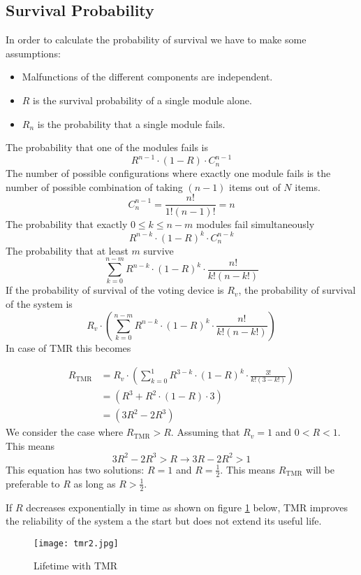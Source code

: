 \documentclass[../main.tex]{subfiles}
\begin{document}
\subsection{Survival Probability}
In order to calculate the probability of survival we have to make some assumptions:
\begin{itemize}
	\item Malfunctions of the different components are independent.
	\item $R$ is the survival probability of a single module alone.
	\item $R_n$ is the probability that a single module fails.
\end{itemize}
The probability that one of the modules fails is
\[
R^{n-1} \cdot (1 - R) \cdot C^{n-1}_{n}
\]
The number of possible configurations where exactly one module fails is the number of possible combination of taking $(n-1)$ items out of $N$ items.
\[
C^{n-1}_{n} = \frac{n!}{1!(n-1)!} = n
\]
The probability that exactly $0 \leq k \leq n-m$ modules fail simultaneously 
\[
R^{n-k} \cdot (1 - R)^k \cdot C^{n-k}_{n}
\]
The probability that at least $m$ survive
\[
\sum^{n-m}_{k=0} R^{n-k} \cdot (1 - R)^k \cdot \frac{n!}{k!(n-k!)}
\]
If the probability of survival of the voting device is $R_v$, the probability of survival of the system is
\[
R_v \cdot \left( \sum^{n-m}_{k=0} R^{n-k} \cdot (1 - R)^k \cdot \frac{n!}{k!(n-k!)} \right)
\]
In case of TMR this becomes

\begin{align*}
R_\text{TMR} & = R_v \cdot \left( \sum^{1}_{k=0} R^{3-k} \cdot (1 - R)^k \cdot \frac{3!}{k!(3-k!)} \right) \\
& = \left( R^3 + R^2 \cdot (1-R) \cdot 3 \right) \\
& = \left( 3R^2 - 2R^3 \right)
\end{align*}
We consider the case where $R_{\text{TMR}} > R$. Assuming that $R_v = 1$ and $0 < R < 1$. This means
\[
3R^2 - 2R^3 > R \rightarrow 3R-2R^2 > 1
\]
This equation has two solutions: $R = 1$ and $R = \frac{1}{2}$. This means $R_{\text{TMR}}$ will be preferable to $R$ as long as $R > \frac{1}{2}$. 

\begin{exmp}
	If $R$ decreases exponentially in time as shown on figure \ref{tmr2} below, TMR improves the reliability of the system a the start but does not extend its useful life.
\begin{figure}[H]
    \centering
    \texttt{[image: tmr2.jpg]}
    \caption{Lifetime with TMR}
    \label{tmr2}
\end{figure}
\end{exmp}
\end{document}
